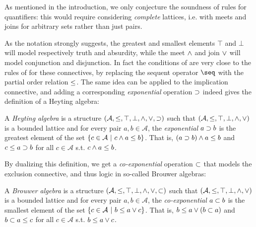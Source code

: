\begin{remark}
  As mentioned in the introduction, we only conjecture the soundness of rules
  for quantifiers: this would require considering \emph{complete} lattices, i.e.
  with meets and joins for arbitrary sets rather than just pairs.
\end{remark}

As the notation strongly suggests, the greatest and smallest elements $\top$ and
$\bot$ will model respectively truth and absurdity, while the meet $\land$ and
join $\lor$ will model conjunction and disjunction. In fact the conditions of
 are very close to the rules of 
for these connectives, by replacing the sequent operator $\seq$ with the partial
order relation $\leq$. The same idea can be applied to the implication
connective, and adding a corresponding \emph{exponential} operation $\supset$
indeed gives the definition of a Heyting algebra:

\begin{definition}
  A \emph{Heyting algebra} is a structure $(\mathcal{A}, \leq, \top, \bot,
  \land, \lor, \supset)$ such that $(\mathcal{A}, \leq, \top, \bot,
  \land, \lor)$ is a bounded lattice and for every pair $a, b \in
  \mathcal{A}$, the \emph{exponential} $a \supset b$ is the greatest element of
  the set $\left\{c \in \mathcal{A} ~\middle|~ c \land a \leq b\right\}$. That is, $(a \supset
  b) \land a \leq b$ and $c \leq a \supset b$ for all $c \in \mathcal{A}$
  s.t. $c \land a \leq b$.
\end{definition}

By dualizing this definition, we get a \emph{co-exponential} operation $\subset$
that models the exclusion connective, and thus  logic in
so-called Brouwer algebras:

\begin{definition}
  A \emph{Brouwer algebra} is a structure $(\mathcal{A}, \leq, \top, \bot,
  \land, \lor, \subset)$ such that $(\mathcal{A}, \leq, \top, \bot,
  \land, \lor)$ is a bounded lattice and for every pair $a, b \in
  \mathcal{A}$, the \emph{co-exponential} $a \subset b$ is the smallest element
  of the set $\left\{c \in \mathcal{A} ~\middle|~ b \leq a \lor c\right\}$. That is, $b
  \leq a \lor (b \subset a)$ and $b \subset a \leq c$ for all $c \in
  \mathcal{A}$ s.t. $b \leq a \lor c$.
\end{definition}

